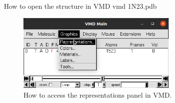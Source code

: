     \begin{bashcmd}[label=cmd:vmd]{How to open the structure in VMD}
    vmd 1N23.pdb
    \end{bashcmd}

    \begin{figure}[H]
        \centering
        \includegraphics[width=0.7\textwidth]{Graphics/ScreenShots/Representations.png}
        \caption{How to access the representations panel in VMD.}
        \label{fig:Repres}
    \end{figure}

